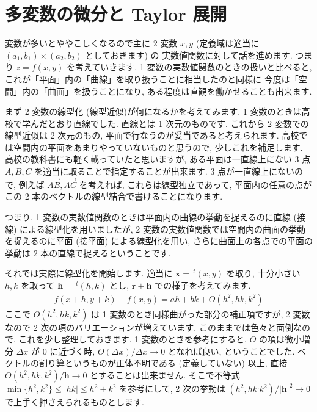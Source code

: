 \documentclass[openany, a4paper, oneside]{book}
\theoremstyle{break}
\theoremstyle{breakdefn}
\begin{document}
\section{多変数の微分と Taylor 展開}
\label{sec-5-2-6}

変数が多いとややこしくなるので主に 2 変数 $x,y$ (定義域は適当に $(a_1,b_1)\times (a_2,b_2)$ としておきます) の
実数値関数に対して話を進めます.
つまり $z=f (x,y)$ を考えていきます.
1 変数の実数値関数のときの扱いと比べると, これが「平面」内の「曲線」を取り扱うことに相当したのと同様に
今度は「空間」内の「曲面」を扱うことになり, ある程度は直観を働かせることも出来ます.

まず 2 変数の線型化 (線型近似)が何になるかを考えてみます.
1 変数のときは高校で学んだとおり直線でした.
直線とは 1 次元のものです.
これから 2 変数での線型近似は 2 次元のもの, 平面で行なうのが妥当であると考えられます.
高校では空間内の平面をあまりやっていないものと思うので, 少しこれを補足します.
高校の教科書にも軽く載っていたと思いますが, ある平面は一直線上にない 3 点 $A,B,C$ を適当に取ることで指定することが出来ます.
3 点が一直線上にないので, 例えば $\overrightarrow{AB},\overrightarrow{AC}$ を考えれば, これらは線型独立であって, 平面内の任意の点が
この 2 本のベクトルの線型結合で書けることになります.

つまり, 1 変数の実数値関数のときは平面内の曲線の挙動を捉えるのに直線 (接線) による線型化を用いましたが,
2 変数の実数値関数では空間内の曲面の挙動を捉えるのに平面 (接平面) による線型化を用い,
さらに曲面上の各点での平面の挙動は 2 本の直線で捉えるということです.

それでは実際に線型化を開始します.
適当に $\bm{x}=\,^t (x,y)$ を取り, 十分小さい $h,k$ を取って $\bm{h}=\,^t (h,k)$ とし,
 $\bm{r}+\bm{h}$ での様子を考えてみます.
    \begin{align}
        f (x+h,y+k) - f (x,y)
        =
        ah + bk + O (h^2,hk,k^2)
    \end{align}
ここで $O (h^2,hk,k^2)$ は 1 変数のとき同様曲がった部分の補正項ですが, 2 変数なので 2 次の項のバリエーションが増えています.
このままでは色々と面倒なので, これを少し整理しておきます.
1 変数のときを参考にすると,  $O$ の項は微小増分 $\Delta x$ が 0 に近づく時,  $O (\Delta x)/\Delta x \to 0$ となれば良い, ということでした.
ベクトルの割り算というものが正体不明である (定義していない) 以上, 直接 $O (h^2,hk,k^2)/\bm{h}\to0$ とすることは出来ません.
そこで不等式 $\min \{ h^2,k^2  \} \leq |hk|\leq h^2 + k^2$ を参考にして, 2 次の挙動は
 $(h^2,hk^,k^2)/|\bm{h}|^2\to0$ で上手く押さえられるものとします.
\end{document}
